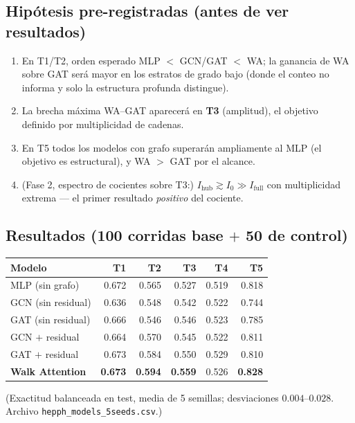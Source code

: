 \documentclass[11pt]{article}
\begin{document}
\subsection{Hip\'otesis pre-registradas (antes de ver resultados)}

\begin{enumerate}
  \item En T1/T2, orden esperado MLP $<$ GCN/GAT $<$ WA; la ganancia de WA
  sobre GAT ser\'a mayor en los estratos de grado bajo (donde el conteo no
  informa y solo la estructura profunda distingue).
  \item La brecha m\'axima WA--GAT aparecer\'a en \textbf{T3} (amplitud), el
  objetivo definido por multiplicidad de cadenas.
  \item En T5 todos los modelos con grafo superar\'an ampliamente al MLP
  (el objetivo es estructural), y WA $>$ GAT por el alcance.
  \item (Fase 2, espectro de cocientes sobre T3:) $I_{\mathrm{hub}}\gtrsim
  I_0\gg I_{\mathrm{full}}$ con multiplicidad extrema --- el primer
  resultado \emph{positivo} del cociente.
\end{enumerate}

\subsection{Resultados (100 corridas base $+$ 50 de control)}

\begin{center}
\begin{tabular}{lrrrrr}
\toprule
\textbf{Modelo} & \textbf{T1} & \textbf{T2} & \textbf{T3} & \textbf{T4} &
\textbf{T5}\\
\midrule
MLP (sin grafo)      & 0.672 & 0.565 & 0.527 & 0.519 & 0.818\\
GCN (sin residual)   & 0.636 & 0.548 & 0.542 & 0.522 & 0.744\\
GAT (sin residual)   & 0.666 & 0.546 & 0.546 & 0.523 & 0.785\\
GCN $+$ residual     & 0.664 & 0.570 & 0.545 & 0.522 & 0.811\\
GAT $+$ residual     & 0.673 & 0.584 & 0.550 & 0.529 & 0.810\\
\textbf{Walk Attention} & \textbf{0.673} & \textbf{0.594} & \textbf{0.559}
& 0.526 & \textbf{0.828}\\
\bottomrule
\end{tabular}
\end{center}
(Exactitud balanceada en test, media de 5 semillas; desviaciones
$0.004$--$0.028$. Archivo \texttt{hepph\_models\_5seeds.csv}.)
\end{document}
